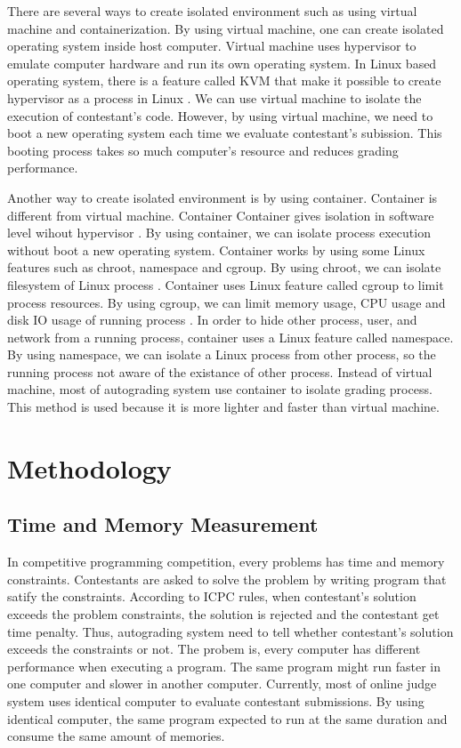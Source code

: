 \documentclass[conference]{IEEEtran}
\begin{document}
There are several ways to create isolated environment such as using virtual machine and containerization. By using virtual machine, one can create isolated operating system inside host computer. Virtual machine uses hypervisor to emulate computer hardware and run its own operating system. In Linux based operating system, there is a feature called KVM that make it possible to create hypervisor as a process in Linux \cite{wfeltervmcontainer}. We can use virtual machine to isolate the execution of contestant's code. However, by using virtual machine, we need to boot a new operating system each time we evaluate contestant's subission. This booting process takes so much computer's resource and reduces grading performance.

Another way to create isolated environment is by using container. Container is different from virtual machine. Container Container gives isolation in software level wihout hypervisor \cite{merkeldocker}. By using container, we can isolate process execution without boot a new operating system. Container works by using some Linux features such as chroot, namespace and cgroup. By using chroot, we can isolate filesystem of Linux process \cite{lessardchroot}. Container uses Linux feature called cgroup to limit process resources. By using cgroup, we can limit memory usage, CPU usage and disk IO usage of running process \cite{wfeltervmcontainer}. In order to hide other process, user, and network from a running process, container uses a Linux feature called namespace. By using namespace, we can isolate a Linux process from other process, so the running process not aware of the existance of other process. Instead of virtual machine, most of autograding system use container to isolate grading process. This method is used because it is more lighter and faster than virtual machine. 

\section{Methodology}

\subsection{Time and Memory Measurement}

In competitive programming competition, every problems has time and memory constraints. Contestants are asked to solve the problem by writing program that satify the constraints. According to ICPC rules, when contestant's solution exceeds the problem constraints, the solution is rejected and the contestant get time penalty. Thus, autograding system need to tell whether contestant's solution exceeds the constraints or not. The probem is, every computer has different performance when executing a program. The same program might run faster in one computer and slower in another computer. Currently, most of online judge system uses identical computer to evaluate contestant submissions. By using identical computer, the same program expected to run at the same duration and consume the same amount of memories.
\end{document}
